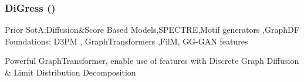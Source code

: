\documentclass[./presentation.tex]{subfiles}
\begin{document}
\begin{frame}[t,label=digress]
  \frametitle{DiGress (\cite{vignacDiGressDiscreteDenoising2023b})}
  \vspace{-1cm}
\footnotesize
\begin{priorart}
{\footnotesize
    Prior SotA:Diffusion\&Score Based Models\citep{niuPermutationInvariantGraph2020b,songGenerativeModelingEstimating2019b},SPECTRE\citep{martinkusSPECTRESpectralConditioning2022b},Motif generators \citep{maziarzLearningExtendMolecular2021},GraphDF\citep{luoGraphDFDiscreteFlow2021d}
\\
Foundations: D3PM \citep{austinStructuredDenoisingDiffusion2021e}, GraphTransformers \citep{vaswaniAttentionAllYou2017c,yunGraphTransformerNetworks2019b},FilM\citep{perezFiLMVisualReasoning2018b}, GG-GAN features \citep{krawczukGGGANGeometricGraph2020}
 }
  \end{priorart}
  \begin{contributions}
    Powerful GraphTransformer, enable use of features with Discrete Graph Diffusion \& Limit Distribution Decomposition 
  \end{contributions}
  \vspace{-0.5cm}
  \begin{columns}
        \footnotesize
    \begin{column}{0.5\textwidth}
    \end{column}
    \begin{column}{0.5\textwidth}
    \end{column}
  \end{columns}
    \vspace{1cm}
  
\end{frame}
\end{document}

